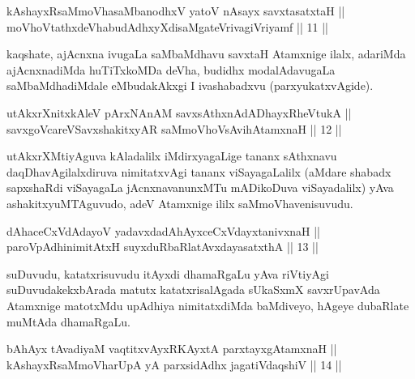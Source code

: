 \begin{shl}
kAshayxRsaMmoVhasaMbanodhxV yatoV nAsayx savxtasatxtaH || \\
moVhoVtathxdeVhabudAdhxyXdisaMgateVrivagiVriyamf \hfill || 11 ||
 
\end{shl}

\begin{artha}
kaqshate, ajAcnxna ivugaLa saMbaMdhavu savxtaH Atamxnige ilalx,
adariMda ajAcnxnadiMda huTiTxkoMDa deVha, budidhx modalAdavugaLa
saMbaMdhadiMdale eMbudakAkxgi I ivashabadxvu (parxyukatxvAgide).
\end{artha}


\begin{shl}
utAkxrXnitxkAleV pArxNAnAM savxsAthxnAdADhayxRheVtukA || \\
savxgoVcareVSavxshakitxyAR saMmoVhoV\s sAvihA\s \s tamxnaH \hfill || 12 ||
  
\end{shl}

\begin{artha}
utAkxrXMtiyAguva kAladalilx iMdirxyagaLige tananx sAthxnavu
daqDhavAgilalxdiruva nimitatxvAgi tananx viSayagaLalilx (aMdare
shabadx sapxshaRdi viSayagaLa jAcnxnavanunxMTu mADikoDuva
viSayadalilx) yAva ashakitxyuMTAguvudo, adeV Atamxnige ililx
saMmoVhavenisuvudu.
\end{artha}


\begin{shl}
dAhaceCxVdAdayoV yadavxdadAhAyxceCxVdayxtanivxnaH || \\
paroVpAdhinimitAtxH suyxduRbaRlatAvxdayasatxthA \hfill || 13 ||
  
\end{shl}

\begin{artha}
suDuvudu, katatxrisuvudu itAyxdi dhamaRgaLu yAva riVtiyAgi
suDuvudakekxbArada matutx katatxrisalAgada sUkaSxmX savxrUpavAda
Atamxnige matotxMdu upAdhiya nimitatxdiMda baMdiveyo, hAgeye dubaRlate
muMtAda dhamaRgaLu.
\end{artha}


\begin{shl}
bAhAyx tAvadiyaM vaqtitxvAyxRKAyxtA parxtayxgAtamxnaH || \\
kAshayxRsaMmoVharUpA yA parxsidAdhx jagatiVdaqshiV \hfill || 14 ||
  
\end{shl}

